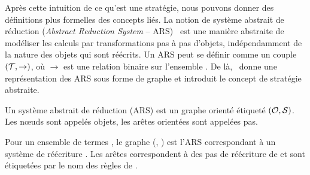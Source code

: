 
Après cette intuition de ce qu'est une stratégie, nous pouvons donner des
définitions plus formelles des concepts liés. La notion de système abstrait de
réduction (\emph{Abstract Reduction System} -- ARS)~\cite{Bezem2003} est une
manière abstraite de modéliser les calculs par transformations pas à pas
d'objets, indépendamment de la nature des objets qui sont réécrits. Un ARS peut
se définir comme un couple $(\mathcal{T},\rightarrow)$, où $\rightarrow$ est une
relation binaire sur l'ensemble \caT. De là,~\cite{Kirchner2008} donne une
représentation des ARS sous forme de graphe et introduit le concept de
stratégie abstraite.


\begin{definition}%
  Un système abstrait de réduction (ARS) est un graphe orienté étiqueté
  $(\mathcal{O}, \mathcal{S})$. Les nœuds \caO sont appelés objets, les arêtes orientées \caS
  sont appelées pas.\\
\end{definition}

Pour un ensemble de termes \TFX, le graphe (\TFX, \caS) est l'ARS correspondant
à un système de réécriture \caR. Les arêtes correspondent à des pas de
réécriture de \caR et sont étiquetées par le nom des règles de \caR. 

